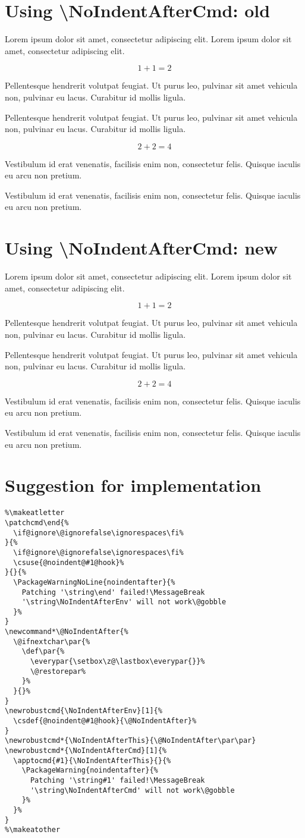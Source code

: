\documentclass{scrartcl}
\begin{document}
\clearpage
\begingroup
\def\NoIndentAfterThis{\newnoindentafter\par\par}
\endgroup
\clearpage

\newcommand*\testcommand[1]{%
  \section*{Using \textbackslash NoIndentAfterCmd: #1}
  Lorem ipsum dolor sit amet, consectetur adipiscing elit. Lorem ipsum dolor 
  sit amet, consectetur adipiscing elit.
  
  \[ 1 + 1 = 2 \]
  
  Pellentesque hendrerit volutpat feugiat. Ut purus leo, pulvinar sit amet 
  vehicula non, pulvinar eu lacus. Curabitur id mollis ligula.
  
  Pellentesque hendrerit volutpat feugiat. Ut purus leo, pulvinar sit amet 
  vehicula non, pulvinar eu lacus. Curabitur id mollis ligula.
  
  \NoIndentAfterCmd \]
  
  \[ 2 + 2 = 4 \]
  
  Vestibulum id erat venenatis, facilisis enim non,
  consectetur felis. Quisque iaculis eu arcu non pretium.
  
  Vestibulum id erat venenatis, facilisis enim non,
  consectetur felis. Quisque iaculis eu arcu non pretium.
}

\begingroup
\testcommand{old}
\endgroup
\clearpage
\begingroup
\def\NoIndentAfterThis{\newnoindentafter\par\par}
\testcommand{new}
\endgroup
\clearpage

\section*{Suggestion for implementation}

\begin{verbatim}
%\makeatletter
\patchcmd\end{%
  \if@ignore\@ignorefalse\ignorespaces\fi%
}{%
  \if@ignore\@ignorefalse\ignorespaces\fi%
  \csuse{@noindent@#1@hook}%
}{}{%
  \PackageWarningNoLine{noindentafter}{%
    Patching '\string\end' failed!\MessageBreak
    '\string\NoIndentAfterEnv' will not work\@gobble
  }%
}
\newcommand*\@NoIndentAfter{%
  \@ifnextchar\par{%
    \def\par{%
      \everypar{\setbox\z@\lastbox\everypar{}}%
      \@restorepar%
    }%
  }{}%
}
\newrobustcmd{\NoIndentAfterEnv}[1]{%
  \csdef{@noindent@#1@hook}{\@NoIndentAfter}%
}
\newrobustcmd*{\NoIndentAfterThis}{\@NoIndentAfter\par\par}
\newrobustcmd*{\NoIndentAfterCmd}[1]{%
  \apptocmd{#1}{\NoIndentAfterThis}{}{%
    \PackageWarning{noindentafter}{%
      Patching '\string#1' failed!\MessageBreak
      '\string\NoIndentAfterCmd' will not work\@gobble
    }%
  }%
}
%\makeatother
\end{verbatim}
\end{document}
